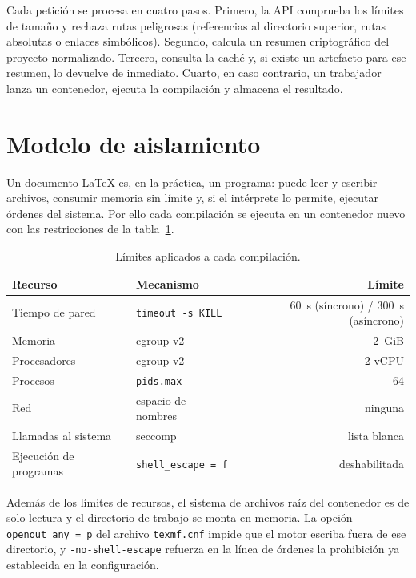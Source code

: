 Cada petición se procesa en cuatro pasos. Primero, la API comprueba los
límites de tamaño y rechaza rutas peligrosas (referencias al directorio
superior, rutas absolutas o enlaces simbólicos). Segundo, calcula un resumen
criptográfico del proyecto normalizado. Tercero, consulta la caché y, si
existe un artefacto para ese resumen, lo devuelve de inmediato. Cuarto, en
caso contrario, un trabajador lanza un contenedor, ejecuta la compilación y
almacena el resultado.

\section{Modelo de aislamiento}
Un documento \LaTeX{} es, en la práctica, un programa: puede leer y escribir
archivos, consumir memoria sin límite y, si el intérprete lo permite,
ejecutar órdenes del sistema. Por ello cada compilación se ejecuta en un
contenedor nuevo con las restricciones de la tabla~\ref{tab:limites}.

\begin{table}[htbp]
  \centering
  \caption{Límites aplicados a cada compilación.}
  \label{tab:limites}
  \begin{tabular}{@{}llr@{}}
    \toprule
    Recurso & Mecanismo & Límite \\
    \midrule
    Tiempo de pared & \texttt{timeout -s KILL} & \SI{60}{s} (síncrono) / \SI{300}{s} (asíncrono) \\
    Memoria & cgroup v2 & \SI{2}{GiB} \\
    Procesadores & cgroup v2 & 2 vCPU \\
    Procesos & \texttt{pids.max} & 64 \\
    Red & espacio de nombres & ninguna \\
    Llamadas al sistema & seccomp & lista blanca \\
    Ejecución de programas & \texttt{shell\_escape = f} & deshabilitada \\
    \bottomrule
  \end{tabular}
\end{table}

Además de los límites de recursos, el sistema de archivos raíz del contenedor
es de solo lectura y el directorio de trabajo se monta en memoria. La opción
\texttt{openout\_any = p} del archivo \texttt{texmf.cnf} impide que el motor
escriba fuera de ese directorio, y \texttt{-no-shell-escape} refuerza en la
línea de órdenes la prohibición ya establecida en la configuración.

